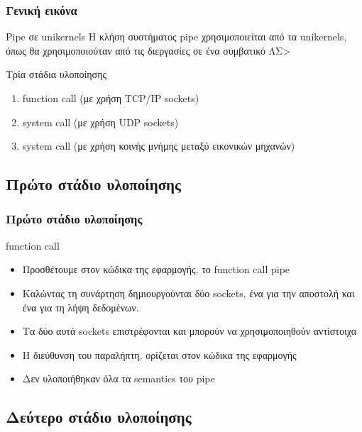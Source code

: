 \documentclass[red,slidestop,notes,compress,mathserif]{beamer}
\begin{document}
\begin{frame}
\frametitle{Γενική εικόνα}
\begin{block}{Pipe σε unikernels}
Η κλήση συστήματος pipe χρησιμοποιείται από τα unikernels, όπως θα χρησιμοποιούταν από τις διεργασίες σε ένα συμβατικό ΛΣ>
\end{block}
\begin{block}{Τρία στάδια υλοποίησης}
\begin{enumerate}
\item function call (με χρήση TCP/IP sockets)
\item system call (με χρήση UDP sockets)
\item system call (με χρήση κοινής μνήμης μεταξύ εικονικών μηχανών)
\end{enumerate}
\end{block}
\end{frame}

\subsection{Πρώτο στάδιο υλοποίησης}

\begin{frame}
\frametitle{Πρώτο στάδιο υλοποίησης}
\begin{block}{function call}
\begin{itemize}
\item Προσθέτουμε στον κώδικα της εφαρμογής, το function call pipe
\item Καλώντας τη συνάρτηση δημιουργούνται δύο sockets, ένα για την αποστολή και ένα για τη λήψη δεδομένων. 
\item Τα δύο αυτά sockets επιστρέφονται και μπορούν να χρησιμοποιηθούν αντίστοιχα
\item Η διεύθυνση του παραλήπτη, ορίζεται στον κώδικα της εφαρμογής
\item Δεν υλοποιήθηκαν όλα τα semantics του pipe 
\end{itemize}
\end{block}
\end{frame}

\subsection{Δεύτερο στάδιο υλοποίησης}
\end{document}
